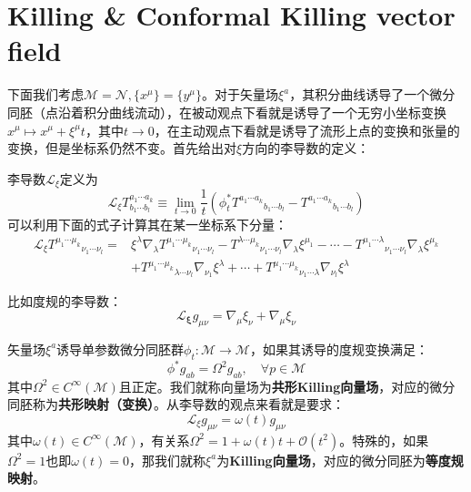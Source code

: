 \section{Killing \& Conformal Killing vector field}
下面我们考虑$\mathcal{M}=\mathcal{N},\{x^\mu\}=\{y^\mu\}$。对于矢量场$\xi^a$，其积分曲线诱导了一个微分同胚（点沿着积分曲线流动），在被动观点下看就是诱导了一个无穷小坐标变换$x^\mu\mapsto x^\mu+\xi^\mu t$，其中$t\to0$，在主动观点下看就是诱导了流形上点的变换和张量的变换，但是坐标系仍然不变。首先给出对$\xi$方向的李导数的定义：
\begin{definition}[李导数]
	李导数$\mathscr{L}_\xi$定义为
	\[\mathscr{L}_{\xi}T^{{a_1\cdots a_k}}_{b_1\cdots b_l}\equiv\lim_{t\to0}\frac{1}{t}\left(\phi_t^*{T^{a_1\cdots a_k}}_{b_1\cdots b_l}-{T^{a_1\cdots a_k}}_{b_1\cdots b_l}\right)\]
	可以利用下面的式子计算其在某一坐标系下分量：
	\begin{equation}
		\begin{aligned}
			\mathscr{L}_{\xi}{T^{\mu_1\cdots \mu_k}}_{\nu_1\cdots\nu_l}=&\xi^\lambda\nabla_\lambda{T^{\mu_1\cdots \mu_k}}_{\nu_1\cdots\nu_l}-{T^{\lambda\cdots \mu_k}}_{\nu_1\cdots\nu_l}\nabla_\lambda\xi^{\mu_1}-\cdots-{T^{\mu_1\cdots \lambda}}_{\nu_1\cdots\nu_l}\nabla_\lambda\xi^{\mu_k}\\
			&+{T^{\mu_1\cdots \mu_k}}_{\lambda\cdots\nu_l}\nabla_{\nu_1}\xi^{\lambda}+\cdots+{T^{\mu_1\cdots \mu_k}}_{\nu_1\cdots\lambda}\nabla_{\nu_l}\xi^{\lambda}
		\end{aligned}		
	\end{equation}
\end{definition}
比如度规的李导数：
\begin{equation}
	\mathscr{L}_\mathbf{\xi} g_{\mu\nu}=\nabla_\mu\xi_\nu+\nabla_\mu\xi_\nu	
\end{equation}
\begin{definition}[Killing]
	矢量场$\xi^a$诱导单参数微分同胚群$\phi_t:\mathcal{M}\to\mathcal{M}$，如果其诱导的度规变换满足：
	\begin{equation}
		\phi^*g_{ab}=\Omega^2g_{ab},\quad \forall p\in\mathcal{M}
	\end{equation}
	其中$\Omega^2\in C^\infty(\mathcal{M})$且正定。我们就称向量场为\textbf{共形Killing向量场}，对应的微分同胚称为\textbf{共形映射（变换）}。从李导数的观点来看就是要求：
	\begin{equation}
		\mathscr{L}_\xi g_{\mu\nu}=\omega(t)g_{\mu\nu}
	\end{equation}
	其中$\omega(t)\in C^\infty(\mathcal{M})$，有关系$\Omega^2=1+\omega(t)t+\mathcal{O}(t^2)$。特殊的，如果$\Omega^2=1$也即$\omega(t)=0$，那我们就称$\xi^a$为\textbf{Killing向量场}，对应的微分同胚为\textbf{等度规映射}。
\end{definition}
